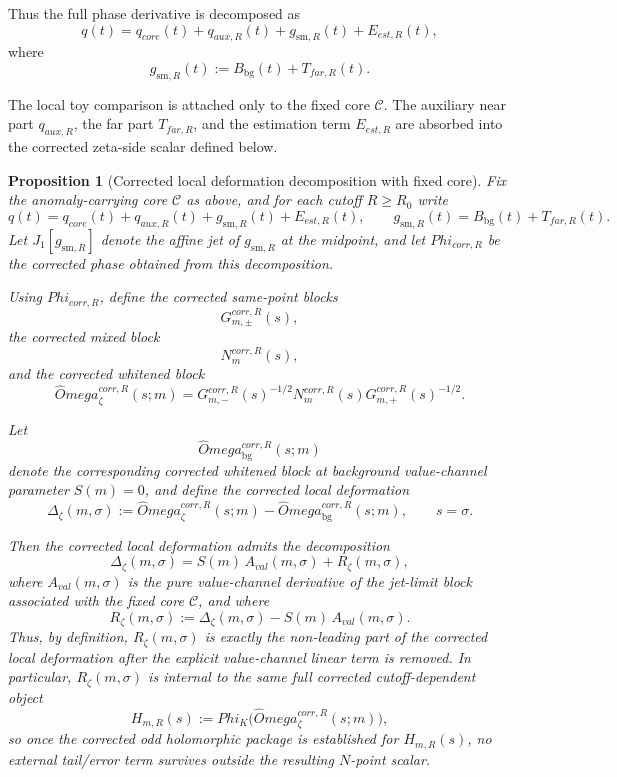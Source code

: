 \documentclass[11pt,a4paper]{amsart}
\def\Omega{Omega}%
\def\Phi{Phi}%
\def\corr{corr}%
\def\val{val}%
\def\far{far}%
\def\est{est}%
\def\core{core}%
\def\aux{aux}%
\theoremstyle{plain}
\newtheorem{proposition}[theorem]{Proposition}
\theoremstyle{definition}
\newcommand{\sm}{\mathrm{sm}}
\newcommand{\far}{\mathrm{far}}
\newcommand{\est}{\mathrm{est}}
\newcommand{\val}{\mathrm{val}}
\newcommand{\corr}{\mathrm{corr}}
\newcommand{\bg}{\mathrm{bg}}
\newcommand{\core}{\mathrm{core}}
\newcommand{\aux}{\mathrm{aux}}
\begin{document}
Thus the full phase derivative is decomposed as
\[
q(t)=q_{\core}(t)+q_{\aux,R}(t)+g_{\sm,R}(t)+E_{\est,R}(t),
\]
where
\[
g_{\sm,R}(t):=B_{\bg}(t)+T_{\far,R}(t).
\]

The local toy comparison is attached only to the fixed core $\mathcal C$. The
auxiliary near part $q_{\aux,R}$, the far part $T_{\far,R}$, and the
estimation term $E_{\est,R}$ are absorbed into the corrected zeta-side scalar
defined below.

\begin{proposition}[Corrected local deformation decomposition with fixed core]
\label{prop:corrected-local-decomposition}
Fix the anomaly-carrying core $\mathcal C$ as above, and for each cutoff
$R\ge R_0$ write
\[
q(t)=q_{\core}(t)+q_{\aux,R}(t)+g_{\sm,R}(t)+E_{\est,R}(t),
\qquad
g_{\sm,R}(t)=B_{\bg}(t)+T_{\far,R}(t).
\]
Let $J_1[g_{\sm,R}]$ denote the affine jet of $g_{\sm,R}$ at the midpoint,
and let $\Phi_{\corr,R}$ be the corrected phase obtained from this
decomposition.

Using $\Phi_{\corr,R}$, define the corrected same-point blocks
\[
G_{m,\pm}^{\corr,R}(s),
\]
the corrected mixed block
\[
N_m^{\corr,R}(s),
\]
and the corrected whitened block
\[
\widehat\Omega_\zeta^{\corr,R}(s;m)
=
G_{m,-}^{\corr,R}(s)^{-1/2}
N_m^{\corr,R}(s)
G_{m,+}^{\corr,R}(s)^{-1/2}.
\]

Let
\[
\widehat\Omega_{\bg}^{\corr,R}(s;m)
\]
denote the corresponding corrected whitened block at background value-channel
parameter $S(m)=0$, and define the corrected local deformation
\[
\Delta_\zeta(m,\sigma)
:=
\widehat\Omega_\zeta^{\corr,R}(s;m)-\widehat\Omega_{\bg}^{\corr,R}(s;m),
\qquad s=\sigma.
\]

Then the corrected local deformation admits the decomposition
\[
\boxed{
\Delta_\zeta(m,\sigma)
=
S(m)\,A_{\val}(m,\sigma)+R_\zeta(m,\sigma),
}
\]
where $A_{\val}(m,\sigma)$ is the pure value-channel derivative of the
jet-limit block associated with the fixed core $\mathcal C$, and where
\[
\boxed{
R_\zeta(m,\sigma)
:=
\Delta_\zeta(m,\sigma)-S(m)\,A_{\val}(m,\sigma).
}
\]
Thus, by definition, $R_\zeta(m,\sigma)$ is exactly the non-leading part of
the corrected local deformation after the explicit value-channel linear term
is removed. In particular, $R_\zeta(m,\sigma)$ is internal to the same full
corrected cutoff-dependent object
\[
H_{m,R}(s):=\Phi_K\!\bigl(\widehat\Omega_\zeta^{\corr,R}(s;m)\bigr),
\]
so once the corrected odd holomorphic package is established for $H_{m,R}(s)$,
no external tail/error term survives outside the resulting $N$-point scalar.
\end{proposition}
\end{document}
